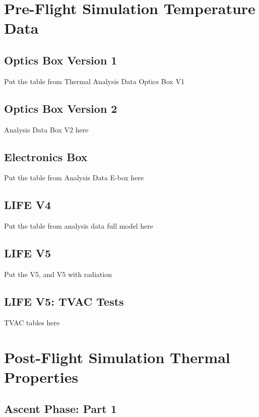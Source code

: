 \chapter{Pre-Flight Simulation Temperature Data}

\section{Optics Box Version 1}

Put the table from Thermal Analysis Data Optics Box V1

\section{Optics Box Version 2}

Analysis Data Box V2 here

\section{Electronics Box}

Put the table from Analysis Data E-box here

\section{LIFE V4}

Put the table from analysis data full model here

\section{LIFE V5}

Put the V5, and V5 with radiation

\section{LIFE V5: TVAC Tests}

TVAC tables here

\chapter{Post-Flight Simulation Thermal Properties}\label{post_flight_thermal_properties_appendix}

\section{Ascent Phase: Part 1}

